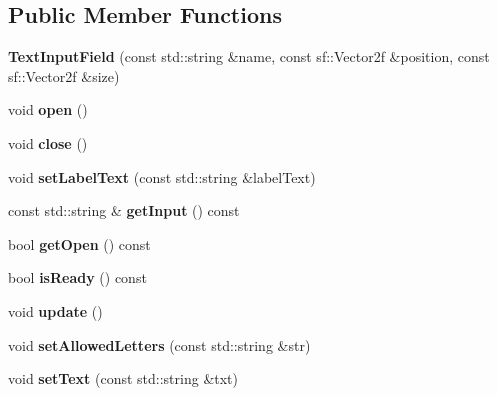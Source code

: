 \subsection*{Public Member Functions}
\begin{DoxyCompactItemize}
\item 
\hypertarget{class_text_input_field_a3f41714f69478545a3756c0000f7e56e}{{\bfseries Text\-Input\-Field} (const std\-::string \&name, const sf\-::\-Vector2f \&position, const sf\-::\-Vector2f \&size)}\label{class_text_input_field_a3f41714f69478545a3756c0000f7e56e}

\item 
\hypertarget{class_text_input_field_a67cf6582f3279aef7cc16d329ab2bbfc}{void {\bfseries open} ()}\label{class_text_input_field_a67cf6582f3279aef7cc16d329ab2bbfc}

\item 
\hypertarget{class_text_input_field_a345495b23609fb42746bdfc873ad425c}{void {\bfseries close} ()}\label{class_text_input_field_a345495b23609fb42746bdfc873ad425c}

\item 
\hypertarget{class_text_input_field_a34eb88372fb6dd4e0f84b47fd6170318}{void {\bfseries set\-Label\-Text} (const std\-::string \&label\-Text)}\label{class_text_input_field_a34eb88372fb6dd4e0f84b47fd6170318}

\item 
\hypertarget{class_text_input_field_ac4c2e650b8481662eaf87b4d0a0e2e68}{const std\-::string \& {\bfseries get\-Input} () const }\label{class_text_input_field_ac4c2e650b8481662eaf87b4d0a0e2e68}

\item 
\hypertarget{class_text_input_field_a7e54c81f77d20cf1e7a1a5580b2d6827}{bool {\bfseries get\-Open} () const }\label{class_text_input_field_a7e54c81f77d20cf1e7a1a5580b2d6827}

\item 
\hypertarget{class_text_input_field_a831cacc7a0e0191a354b24c7e9ca6186}{bool {\bfseries is\-Ready} () const }\label{class_text_input_field_a831cacc7a0e0191a354b24c7e9ca6186}

\item 
\hypertarget{class_text_input_field_acae36fdc758a9c783ebe329e650b697e}{void {\bfseries update} ()}\label{class_text_input_field_acae36fdc758a9c783ebe329e650b697e}

\item 
\hypertarget{class_text_input_field_a5469a141665b1cc321b6d59b8d4de7fd}{void {\bfseries set\-Allowed\-Letters} (const std\-::string \&str)}\label{class_text_input_field_a5469a141665b1cc321b6d59b8d4de7fd}

\item 
\hypertarget{class_text_input_field_a844c6ce12cb179bb2dd55a3491be0ef4}{void {\bfseries set\-Text} (const std\-::string \&txt)}\label{class_text_input_field_a844c6ce12cb179bb2dd55a3491be0ef4}

\end{DoxyCompactItemize}
